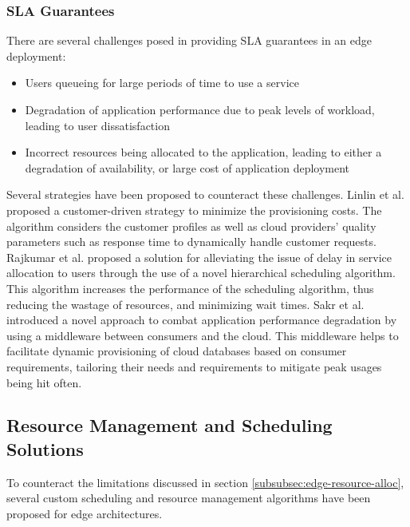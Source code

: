 \subsubsection{SLA Guarantees}
\label{subsubsec:sla-edge}

There are several challenges posed in providing SLA guarantees in an edge deployment:
\begin{itemize}
    \item Users queueing for large periods of time to use a service \cite{venticinque2011cloud}
    \item Degradation of application performance due to peak levels of workload, leading to user dissatisfaction \cite{sakr2012sla}
    \item Incorrect resources being allocated to the application, leading to either a degradation of availability, or large cost of application deployment \cite{houlihan2014auditing}
\end{itemize}

Several strategies have been proposed to counteract these challenges. Linlin et al. \cite{wu2013sla} proposed a customer-driven strategy  to minimize the provisioning costs. The algorithm considers the customer profiles as well as cloud providers' quality parameters such as response time to dynamically handle customer requests. Rajkumar et al. \cite{rajavel2012achieving} proposed a solution for alleviating the issue of delay in service allocation to users through the use of a novel hierarchical scheduling algorithm. This algorithm increases the performance of the scheduling algorithm, thus reducing the wastage of resources, and minimizing wait times. Sakr et al. \cite{sakr2012sla} introduced a novel approach to combat application performance degradation by using a middleware between consumers and the cloud. This middleware helps to facilitate dynamic provisioning of cloud databases based on consumer requirements, tailoring their needs and requirements to mitigate peak usages being hit often.

\subsection{Resource Management and Scheduling Solutions}
\label{subsec:resource-schedule-solutions}

To counteract the limitations discussed in section \ref{subsubsec:edge-resource-alloc}, several custom scheduling and resource management algorithms have been proposed for edge architectures.\par

